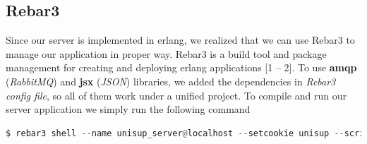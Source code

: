 \subsection{Rebar3}
Since our server is implemented in erlang, we realized that we can use Rebar3 to manage our application in proper way. Rebar3 is a build tool and package management for creating and deploying erlang applications [1 – 2]. To use \textbf{amqp} (\textit{RabbitMQ}) and \textbf{jsx} (\textit{JSON}) libraries, we added the dependencies in \textit{Rebar3 config file}, so all of them work under a unified project. To compile and run our server application we simply run the following command

\begin{lstlisting}[language=python]
	$ rebar3 shell --name unisup_server@localhost --setcookie unisup --script src/run\_listener.escript
\end{lstlisting}

